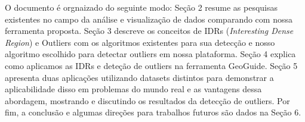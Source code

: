 
O documento é orgnaizado do seguinte modo: Seção 2 resume as pesquisas existentes no campo da análise e visualização de dados comparando com nossa ferramenta proposta. Seção 3 descreve os conceitos de IDRs (\textit{Interesting Dense Region}) e Outliers com os algoritmos existentes para sua detecção e nosso algoritmo escolhido para detectar outliers em nossa plataforma. Seção 4 explica como aplicamos as IDRs e deteção de outliers na ferramenta GeoGuide. Seção 5 apresenta duas aplicações utilizando datasets distintos para demonstrar a aplicabilidade disso em problemas do mundo real e as vantagens dessa abordagem, mostrando e discutindo os resultados da detecção de outliers. Por fim, a conclusão e algumas direções para trabalhos futuros são dados na Seção 6.
